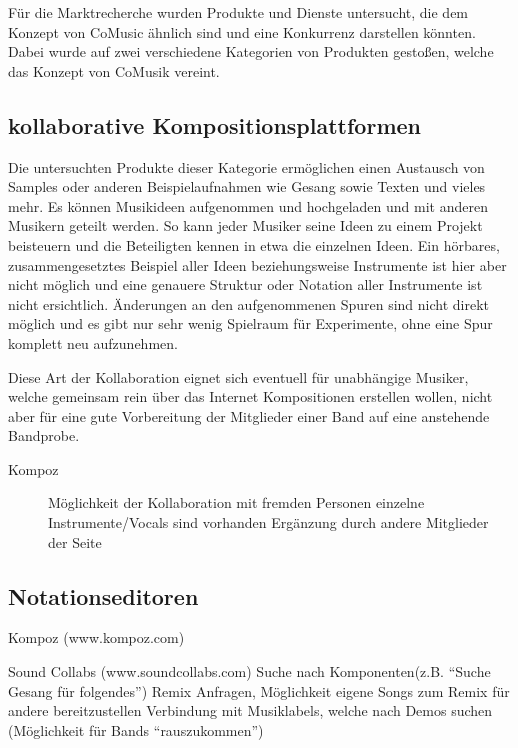 \documentclass[12pt]{scrartcl}
\begin{document}

Für die Marktrecherche wurden Produkte und Dienste untersucht, die dem Konzept von CoMusic ähnlich sind und eine Konkurrenz darstellen könnten. Dabei wurde auf zwei verschiedene Kategorien von Produkten gestoßen, welche das Konzept von CoMusik vereint.

\subsection{kollaborative Kompositionsplattformen}

Die untersuchten Produkte dieser Kategorie ermöglichen einen Austausch von Samples oder anderen Beispielaufnahmen wie Gesang sowie Texten und vieles mehr. Es können Musikideen aufgenommen und hochgeladen und mit anderen Musikern geteilt werden. So kann jeder Musiker seine Ideen zu einem Projekt beisteuern und die Beteiligten kennen in etwa die einzelnen Ideen. Ein hörbares, zusammengesetztes Beispiel aller Ideen beziehungsweise Instrumente ist hier aber nicht möglich und eine genauere Struktur oder Notation aller Instrumente ist nicht ersichtlich. Änderungen an den aufgenommenen Spuren sind nicht direkt möglich und es gibt nur sehr wenig Spielraum für Experimente, ohne eine Spur komplett neu aufzunehmen.

Diese Art der Kollaboration eignet sich eventuell für unabhängige Musiker, welche gemeinsam rein über das Internet Kompositionen erstellen wollen, nicht aber für eine gute Vorbereitung der Mitglieder einer Band auf eine anstehende Bandprobe.

\begin{description}
\item[Kompoz]
Möglichkeit der Kollaboration mit fremden Personen
einzelne Instrumente/Vocals sind vorhanden
Ergänzung durch andere Mitglieder der Seite 

\end{description}


\subsection{Notationseditoren}






Kompoz (www.kompoz.com)


Sound Collabs (www.soundcollabs.com)
Suche nach Komponenten(z.B. “Suche Gesang für folgendes”)
Remix Anfragen, Möglichkeit eigene Songs zum Remix für andere bereitzustellen
Verbindung mit Musiklabels, welche nach Demos suchen (Möglichkeit für Bands “rauszukommen”)
\end{document}
